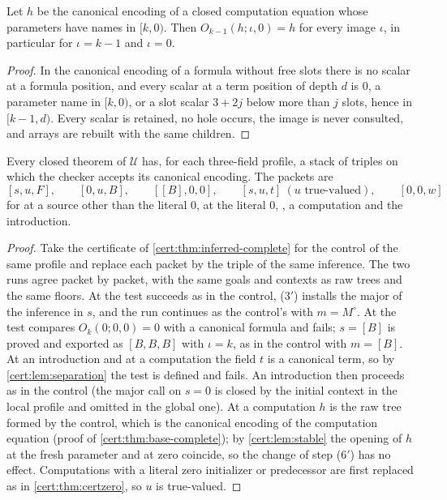 \begin{lemma}\label{cert:lem:stable}
Let $h$ be the canonical encoding of a closed computation equation whose
parameters have names in $[k,0)$. Then $O_{k-1}(h;\iota,0)=h$ for every image
$\iota$, in particular for $\iota=k-1$ and $\iota=0$.
\end{lemma}
\begin{proof}
In the canonical encoding of a formula without free slots there is no scalar
at a formula position, and every scalar at a term position of depth $d$ is
$0$, a parameter name in $[k,0)$, or a slot scalar $3+2j$ below more than $j$
slots, hence in $[k-1,d)$. Every scalar is retained, no hole occurs, the image
is never consulted, and arrays are rebuilt with the same children.
\end{proof}

\begin{theorem}\label{cert:thm:three-complete}
Every closed theorem of $\mathcal U$ has, for each three-field profile, a stack
of triples on which the checker accepts its canonical encoding. The packets
are
\[
[s,u,F],\qquad [0,u,B],\qquad [[B],0,0],\qquad [s,u,t]\ (u\text{ true-valued}),\qquad [0,0,w]
\]
for  at a source other than the literal $0$,  at
the literal $0$, , a computation and the introduction.
\end{theorem}
\begin{proof}
Take the certificate of \cref{cert:thm:inferred-complete} for the control of
the same profile and replace each packet by the triple of the same inference.
The two runs agree packet by packet, with the same goals and contexts as raw
trees and the same floors. At  the test succeeds as in the
control, (3$'$) installs the major of the inference in $s$, and the run
continues as the control's with $m=M^{\circ}$. At  the test
compares $O_k(0;0,0)=0$ with a canonical formula and fails; $s=[B]$ is proved
and exported as $[B,B,B]$ with $\iota=k$, as in the control with $m=[B]$. At an
introduction and at a computation the field $t$ is a canonical term, so by
\cref{cert:lem:separation} the test is defined and fails. An introduction
then proceeds as in the control (the major call on $s=0$ is closed by the
initial context in the local profile and omitted in the global one). At a
computation $h$ is the raw tree formed by the control, which is the canonical
encoding of the computation equation (proof of
\cref{cert:thm:base-complete}); by \cref{cert:lem:stable} the opening of $h$ at
the fresh parameter and at zero coincide, so the change of step (6$'$) has no
effect. Computations with a literal zero initializer or predecessor are first
replaced as in \cref{cert:thm:certzero}, so $u$ is true-valued.
\end{proof}

